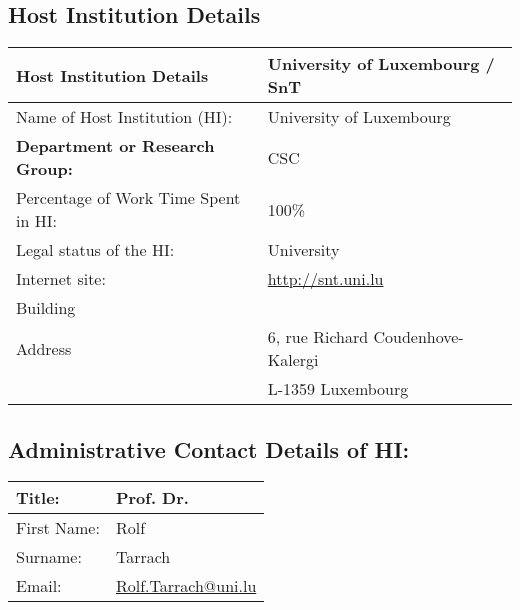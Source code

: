 % 

\subsection{Host Institution Details}

\begin{center}
    \small
    \begin{tabular}{|l|l|}
        \hline
        \textbf{Host Institution Details}      & University of Luxembourg / SnT \\\hline
        Name of Host Institution (HI):         & University of Luxembourg \\\hline
        \textbf{Department or Research Group:} & CSC \\\hline
        Percentage of Work Time Spent in HI:   & 100\% \\\hline
        Legal status of the HI:                & University \\\hline
        Internet site:                         & \url{http://snt.uni.lu} \\\hline
        Building                               & \\\hline
        Address                                & 6, rue Richard Coudenhove-Kalergi\\
        &                                        L-1359 Luxembourg
        \\\hline
    \end{tabular}
\end{center}


\subsection{Administrative Contact Details of HI:}

\begin{center}
    \small
    \begin{tabular}{|l|l|}
        \hline
        Title:       & Prof. Dr. \\\hline
        First Name:  & Rolf \\\hline
        Surname:     & Tarrach \\\hline
        Email:       & \url{Rolf.Tarrach@uni.lu}
        \\\hline
    \end{tabular}
\end{center}



